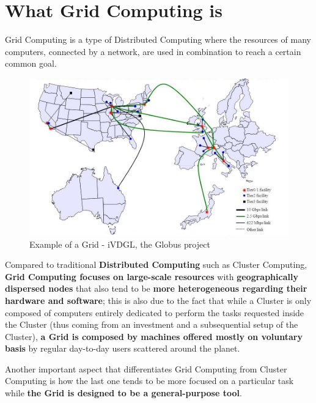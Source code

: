 \section{What Grid Computing is}
Grid Computing is a type of Distributed Computing where the resources of many computers, connected by a network, are used in combination to reach a certain common goal.

\begin{figure}[!ht]
    \centering
    \includegraphics[scale=0.43]{document/chapters/chapter_1/images/iVDGL_globus.jpg}
    \caption{Example of a Grid - iVDGL, the Globus project \cite{iVDGL}}
    \label{fig:iVDGL}
\end{figure}

Compared to traditional \textbf{Distributed Computing} such as Cluster Computing, \textbf{Grid Computing focuses on large-scale resources} with \textbf{geographically dispersed nodes} that also tend to be \textbf{more heterogeneous regarding their hardware and software}; this is also due to the fact that while a Cluster is only composed of computers entirely dedicated to perform the tasks requested inside the Cluster (thus coming from an investment and a subsequential setup of the Cluster), \textbf{a Grid is composed by machines offered mostly on voluntary basis} by regular day-to-day users scattered around the planet.

Another important aspect that differentiates Grid Computing from Cluster Computing is how the last one tends to be more focused on a particular task while \textbf{the Grid is designed to be a general-purpose tool}.

